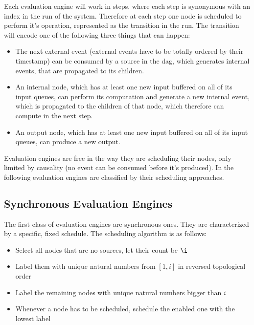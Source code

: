 Each evaluation engine will work in steps, where each step is synonymous with an index in the run of the system.
Therefore at each step one node is scheduled to perform it's operation, represented as the transition in the run.
The transition will encode one of the following three things that can happen:

\begin{itemize}
  \item The next external event (external events have to be totally ordered by their timestamp) can be consumed by a source in the \gls{dag}, which generates internal events, that are propagated to its children.
  \item An internal node, which has at least one new input buffered on all of its input queues, can perform
    its computation and generate a new internal event, which is propagated to the children of that node, which therefore can compute in the next step.
  \item An output node, which has at least one new input buffered on all of its input queues, can produce a new output.
\end{itemize}

Evaluation engines are free in the way they are scheduling their nodes, only limited by causality (no event can be consumed before it's produced).
In the following evaluation engines are classified by their scheduling approaches.

\subsection{Synchronous Evaluation Engines}
\label{sec:concepts:behaviour_without_timing:synchronous}

The first class of evaluation engines are synchronous ones.
They are characterized by a specific, fixed schedule.
The scheduling algorithm is as follows:

\begin{itemize}
  \item Select all nodes that are no sources, let their count be \(\i\)
  \item Label them with unique natural numbers from \([1,i]\) in reversed topological order
  \item Label the remaining nodes with unique natural numbers bigger than \(i\)
  \item Whenever a node has to be scheduled, schedule the enabled one with the lowest label
\end{itemize}

